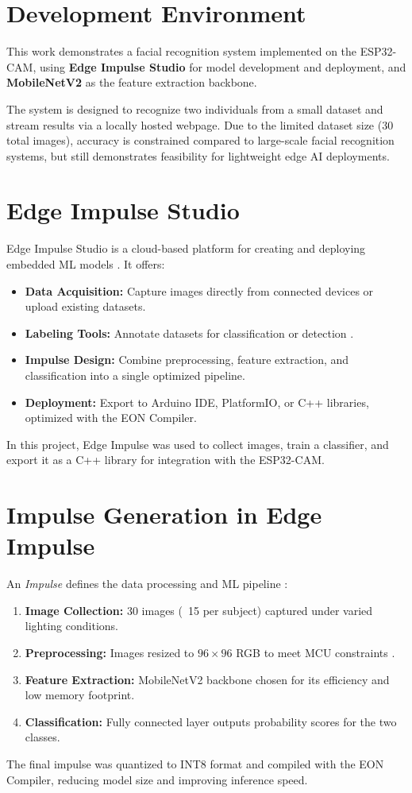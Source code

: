 \section{Development Environment}

This work demonstrates a facial recognition system implemented on the ESP32-CAM, using \textbf{Edge Impulse Studio} for model development and deployment, and \textbf{MobileNetV2} \cite{Sandler:2018} as the feature extraction backbone.  

The system is designed to recognize two individuals from a small dataset and stream results via a locally hosted webpage. Due to the limited dataset size (30 total images), accuracy is constrained compared to large-scale facial recognition systems, but still demonstrates feasibility for lightweight edge AI deployments.

\section{Edge Impulse Studio}
Edge Impulse Studio is a cloud-based platform for creating and deploying embedded ML models \cite{EI:2023}. It offers:
\begin{itemize}
    \item \textbf{Data Acquisition:} Capture images directly from connected devices or upload existing datasets.
    \item \textbf{Labeling Tools:} Annotate datasets for classification or detection \cite{Howard:2017}.
    \item \textbf{Impulse Design:} Combine preprocessing, feature extraction, and classification into a single optimized pipeline.
    \item \textbf{Deployment:} Export to Arduino IDE, PlatformIO, or C++ libraries, optimized with the EON Compiler.
\end{itemize}
In this project, Edge Impulse was used to collect images, train a classifier, and export it as a C++ library for integration with the ESP32-CAM.

\section{Impulse Generation in Edge Impulse}
An \emph{Impulse} defines the data processing and ML pipeline \cite{EI:2023}:
\begin{enumerate}
    \item \textbf{Image Collection:} 30 images (~15 per subject) captured under varied lighting conditions.
    \item \textbf{Preprocessing:} Images resized to $96\times96$ RGB to meet MCU constraints \cite{Redmon:2016}.
    \item \textbf{Feature Extraction:} MobileNetV2 backbone chosen for its efficiency and low memory footprint.
    \item \textbf{Classification:} Fully connected layer outputs probability scores for the two classes.
\end{enumerate}
The final impulse was quantized to INT8 format and compiled with the EON Compiler, reducing model size and improving inference speed.

